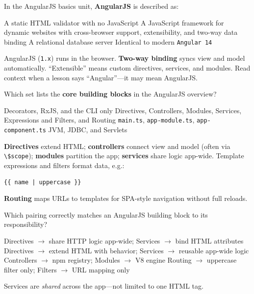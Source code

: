 \question[4]
In the AngularJS basics unit, \textbf{AngularJS} is described as:
\begin{choices}
  \choice A static HTML validator with no JavaScript
  \CorrectChoice A JavaScript framework for dynamic websites with cross-browser support, extensibility, and two-way data binding
  \choice A relational database server
  \choice Identical to modern \texttt{Angular~14}
\end{choices}
\begin{solution}
  AngularJS (\texttt{1.x}) runs in the browser. \textbf{Two-way binding} syncs view and model automatically. ``Extensible'' means custom directives, services, and modules. Read context when a lesson says ``Angular''---it may mean AngularJS.
\end{solution}

\question[4]
Which set lists the \textbf{core building blocks} in the AngularJS overview?
\begin{choices}
  \choice Decorators, RxJS, and the CLI only
  \CorrectChoice Directives, Controllers, Modules, Services, Expressions and Filters, and Routing
  \choice \texttt{main.ts}, \texttt{app-module.ts}, \texttt{app-component.ts}
  \choice JVM, JDBC, and Servlets
\end{choices}
\begin{solution}
  \textbf{Directives} extend HTML; \textbf{controllers} connect view and model (often via \lstinline[style=tsinline]{\$scope}); \textbf{modules} partition the app; \textbf{services} share logic app-wide. Template expressions and filters format data, e.g.:
\begin{lstlisting}[style=js]
{{ name | uppercase }}
\end{lstlisting}
  \textbf{Routing} maps URLs to templates for SPA-style navigation without full reloads.
\end{solution}

\question[4]
Which pairing correctly matches an AngularJS building block to its responsibility?
\begin{choices}
  \choice Directives $\rightarrow$ share HTTP logic app-wide; Services $\rightarrow$ bind HTML attributes
  \CorrectChoice Directives $\rightarrow$ extend HTML with behavior; Services $\rightarrow$ reusable app-wide logic
  \choice Controllers $\rightarrow$ npm registry; Modules $\rightarrow$ V8 engine
  \choice Routing $\rightarrow$ uppercase filter only; Filters $\rightarrow$ URL mapping only
\end{choices}
\begin{solution}
  Services are \emph{shared} across the app---not limited to one HTML tag.
\end{solution}

